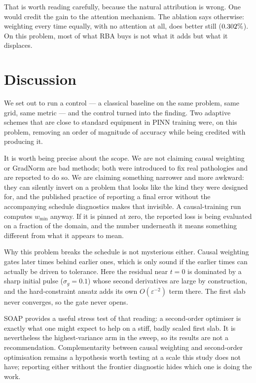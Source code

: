 That is worth reading carefully, because the natural attribution is wrong. One
would credit the gain to the attention mechanism. The ablation says otherwise:
weighting every time equally, with no attention at all, does better still
($0.302\%$). On this problem, most of what RBA buys is not what it adds
but what it displaces.

\section{Discussion}
\label{sec:discussion}

We set out to run a control --- a classical baseline on the same problem, same
grid, same metric --- and the control turned into the finding. Two adaptive
schemes that are close to standard equipment in PINN training were, on this
problem, removing an order of magnitude of accuracy while being credited with
producing it.

It is worth being precise about the scope. We are not claiming causal weighting
or GradNorm are bad methods; both were introduced to fix real pathologies and
are reported to do so. We are claiming something narrower and more awkward:
they can silently invert on a problem that looks like the kind they were
designed for, and the published practice of reporting a final error without the
accompanying schedule diagnostics makes that invisible. A causal-training run
computes $w_{\min}$ anyway. If it is pinned at zero, the reported loss is being
evaluated on a fraction of the domain, and the number underneath it means
something different from what it appears to mean.

Why this problem breaks the schedule is not mysterious either. Causal weighting
gates later times behind earlier ones, which is only sound if the earlier times
can actually be driven to tolerance. Here the residual near $t = 0$ is
dominated by a sharp initial pulse ($\sigma_g = 0.1$) whose second derivatives
are large by construction, and the hard-constraint ansatz adds its own
$O(\varepsilon^{-2})$ term there. The first slab never converges, so the gate
never opens.

SOAP provides a useful stress test of that reading: a second-order optimiser is
exactly what one might expect to help on a stiff, badly scaled first slab. It is
nevertheless the highest-variance arm in the sweep, so its results are not a
recommendation. Complementarity between causal weighting and
second-order optimisation remains a hypothesis worth testing at a scale this
study does not have; reporting either without the frontier diagnostic hides
which one is doing the work.

